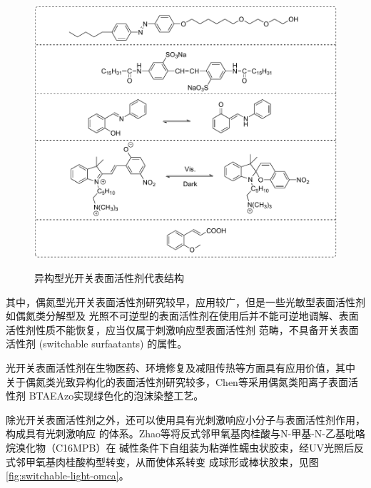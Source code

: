 \documentclass[bachelor,winfonts,replaceperiod]{jnuthesis}
\begin{document}
    \begin{figure}[htbp]
        \centering
        \includegraphics[scale=0.8]{Figure/switchable-light.pdf}\\
        \caption{异构型光开关表面活性剂代表结构\cite{张冤帝2017,karthaus1996,shang2003,吕湘亮2018}}\label{fig:switchable-light}
    \end{figure}
    
    其中，偶氮型光开关表面活性剂研究较早，应用较广，但是一些光敏型表面活性剂\cite{刘清斌2018}如偶氮类分解型及
    光照不可逆型的表面活性剂在使用后并不能可逆地调解、表面活性剂性质不能恢复，应当仅属于刺激响应型表面活性剂
    范畴，不具备开关表面活性剂 (switchable surfaatants) 的属性。
    
    光开关表面活性剂在生物医药、环境修复及减阻传热等方面具有应用价值\cite{刘清斌2018}，其中
    关于偶氮类光致异构化的表面活性剂研究较多，Chen等\cite{chen2016}采用偶氮类阳离子表面活性剂
    BTAEAzo实现绿色化的泡沫染整工艺。
    
    除光开关表面活性剂之外，还可以使用具有光刺激响应小分子与表面活性剂作用，构成具有光刺激响应
    的体系。Zhao等\cite{zhao2016}将反式邻甲氧基肉桂酸与N-甲基-N-乙基吡咯烷溴化物（C16MPB）在
    碱性条件下自组装为粘弹性蠕虫状胶束，经UV光照后反式邻甲氧基肉桂酸构型转变，从而使体系转变
    成球形或棒状胶束，见图\ref{fig:switchable-light-omca}。
    
\end{document}
